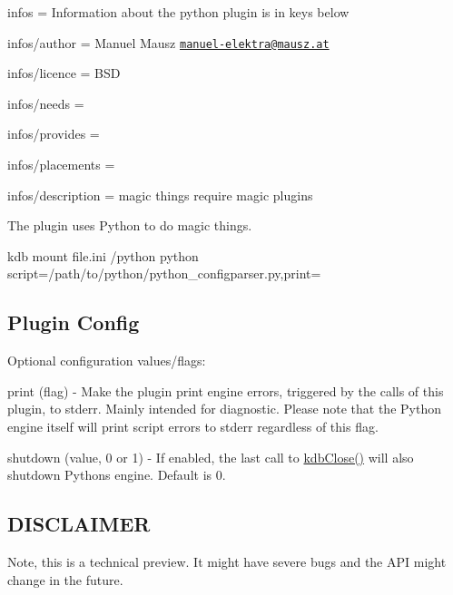 
\begin{DoxyItemize}
\item infos = Information about the python plugin is in keys below
\item infos/author = Manuel Mausz \href{mailto:manuel-elektra@mausz.at}{\tt manuel-\/elektra@mausz.\+at}
\item infos/licence = B\+S\+D
\item infos/needs =
\item infos/provides =
\item infos/placements =
\item infos/description = magic things require magic plugins
\end{DoxyItemize}

The plugin uses Python to do magic things.

\begin{DoxyVerb}kdb mount file.ini /python python script=/path/to/python/python_configparser.py,print=
\end{DoxyVerb}


\subsection*{Plugin Config}

Optional configuration values/flags\+:
\begin{DoxyItemize}
\item print (flag) -\/ Make the plugin print engine errors, triggered by the calls of this plugin, to stderr. Mainly intended for diagnostic. Please note that the Python engine itself will print script errors to stderr regardless of this flag.
\item shutdown (value, 0 or 1) -\/ If enabled, the last call to {\ttfamily \hyperlink{group__kdb_gadb54dc9fda17ee07deb9444df745c96f}{kdb\+Close()}} will also shutdown Pythons engine. Default is 0.
\end{DoxyItemize}

\subsection*{D\+I\+S\+C\+L\+A\+I\+M\+E\+R}

Note, this is a technical preview. It might have severe bugs and the A\+P\+I might change in the future. 